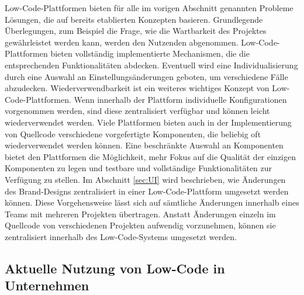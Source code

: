 \documentclass[acmtog, language=ngerman]{acmart}
\begin{document}
Low-Code-Plattformen bieten für alle im vorigen Abschnitt genannten Probleme Lösungen, die auf bereits etablierten Konzepten basieren. Grundlegende Überlegungen, zum Beispiel die Frage, wie die Wartbarkeit des Projektes gewährleistet werden kann, werden den Nutzenden abgenommen. Low-Code-Plattformen bieten vollständig implementierte Mechanismen, die die entsprechenden Funktionalitäten abdecken. Eventuell wird eine Individualisierung durch eine Auswahl an Einstellungsänderungen geboten, um verschiedene Fälle abzudecken.
Wiederverwendbarkeit ist ein weiteres wichtiges Konzept von Low-Code-Plattformen.
Wenn innerhalb der Plattform individuelle Konfigurationen vorgenommen werden, sind diese zentralisiert verfügbar und können leicht wiederverwendet werden. 
Viele Plattformen bieten auch in der Implementierung von Quellcode verschiedene vorgefertigte Komponenten, die beliebig oft wiederverwendet werden können. Eine beschränkte Auswahl an Komponenten bietet den Plattformen die Möglichkeit, mehr Fokus auf die Qualität der einzigen Komponenten zu legen und testbare und vollständige Funktionalitäten zur Verfügung zu stellen.
Im Abschnitt \href{}{\ref{sec:UI}} wird beschrieben, wie Änderungen des Brand-Designs zentralisiert in einer Low-Code-Plattform umgesetzt werden können. Diese Vorgehensweise lässt sich auf sämtliche Änderungen innerhalb eines Teams mit mehreren Projekten übertragen. Anstatt Änderungen einzeln im Quellcode von verschiedenen Projekten aufwendig vorzunehmen, können sie zentralisiert innerhalb des Low-Code-Systems umgesetzt werden.

\subsection{Aktuelle Nutzung von Low-Code in Unternehmen}\label{sec:Aktuelle_Nutzung}
\end{document}
